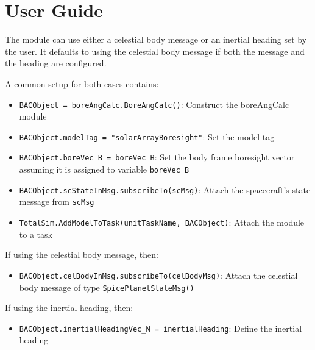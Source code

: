 \section{User Guide}

The module can use either a celestial body message or an inertial heading set by the user. It defaults to using the celestial body message if both the message and the heading are configured.

A common setup for both cases contains:

\begin{itemize}
  \item[-]      \texttt{BACObject = boreAngCalc.BoreAngCalc()}: Construct the boreAngCalc module
  \item[-]   \texttt{BACObject.modelTag = "solarArrayBoresight"}: Set the model tag
  \item[-]   \texttt{BACObject.boreVec\_B = boreVec\_B}: Set the body frame boresight vector assuming it is assigned to variable \texttt{boreVec\_B}
  \item[-]   \texttt{BACObject.scStateInMsg.subscribeTo(scMsg)}: Attach the spacecraft's state message from \texttt{scMsg}
  \item[-]   \texttt{TotalSim.AddModelToTask(unitTaskName, BACObject)}: Attach the module to a task
\end{itemize}

If using the celestial body message, then:

\begin{itemize}
     \item[-]   \texttt{BACObject.celBodyInMsg.subscribeTo(celBodyMsg)}: Attach the celestial body message of type \texttt{SpicePlanetStateMsg()}
\end{itemize}

If using the inertial heading, then:

\begin{itemize}
     \item[-]   \texttt{BACObject.inertialHeadingVec\_N = inertialHeading}: Define the inertial heading
\end{itemize}
